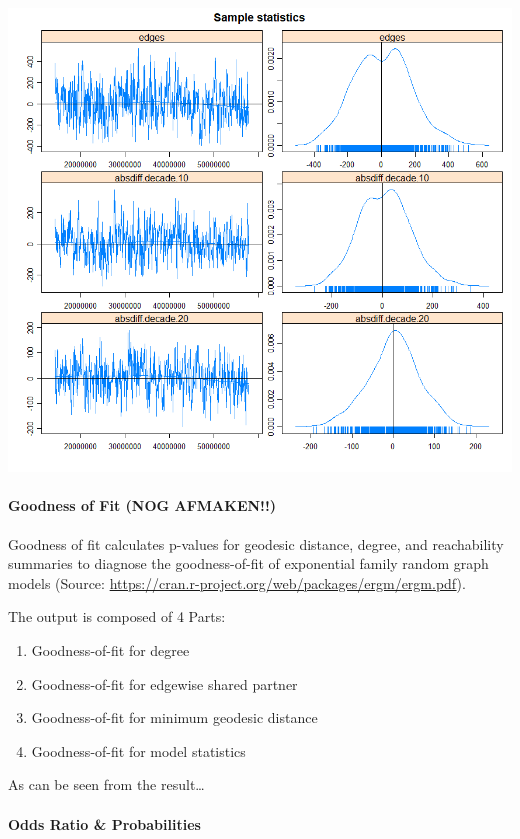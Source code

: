 \documentclass[
  english,
  man,floatsintext]{apa6}
\providecommand{\tightlist}{%
  \setlength{\itemsep}{0pt}\setlength{\parskip}{0pt}}
\let\oldparagraph\paragraph
\renewcommand{\paragraph}[1]{\oldparagraph{#1}\mbox{}}
\begin{document}
\includegraphics{ergm_result/mcmc_diagnostics_3.png}

\hypertarget{goodness-of-fit-nog-afmaken}{%
\paragraph{Goodness of Fit (NOG AFMAKEN!!)}\label{goodness-of-fit-nog-afmaken}}

Goodness of fit calculates p-values for geodesic distance, degree, and reachability summaries to diagnose the goodness-of-fit of exponential family random graph models (Source: \url{https://cran.r-project.org/web/packages/ergm/ergm.pdf}).

The output is composed of 4 Parts:

\begin{enumerate}
\def\labelenumi{\arabic{enumi}.}
\tightlist
\item
  Goodness-of-fit for degree
\item
  Goodness-of-fit for edgewise shared partner
\item
  Goodness-of-fit for minimum geodesic distance
\item
  Goodness-of-fit for model statistics
\end{enumerate}

As can be seen from the result\ldots{}

\hypertarget{odds-ratio-probabilities}{%
\paragraph{Odds Ratio \& Probabilities}\label{odds-ratio-probabilities}}
\end{document}
